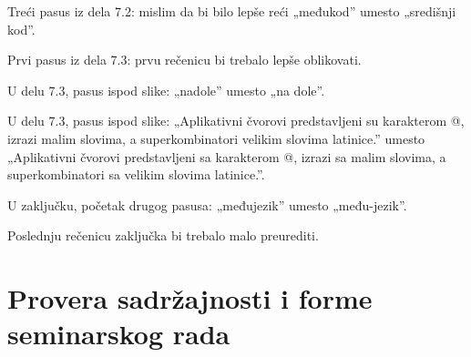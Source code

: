 \documentclass[a4paper]{report}
\begin{document}
Treći pasus iz dela 7.2: mislim da bi bilo lepše reći „međukod” umesto „središnji kod”.

Prvi pasus iz dela 7.3: prvu rečenicu bi trebalo lepše oblikovati.

U delu 7.3, pasus ispod slike: „nadole” umesto „na dole”.

U delu 7.3, pasus ispod slike: „Aplikativni čvorovi predstavljeni su karakterom @, izrazi malim slovima, a superkombinatori velikim slovima latinice.” umesto „Aplikativni čvorovi predstavljeni sa karakterom @, izrazi sa malim slovima, a superkombinatori sa velikim slovima latinice.”.

U zaključku, početak drugog pasusa: „međujezik” umesto „među-jezik”.

Poslednju rečenicu zaključka bi trebalo malo preurediti.

\section{Provera sadržajnosti i forme seminarskog rada}
\end{document}

